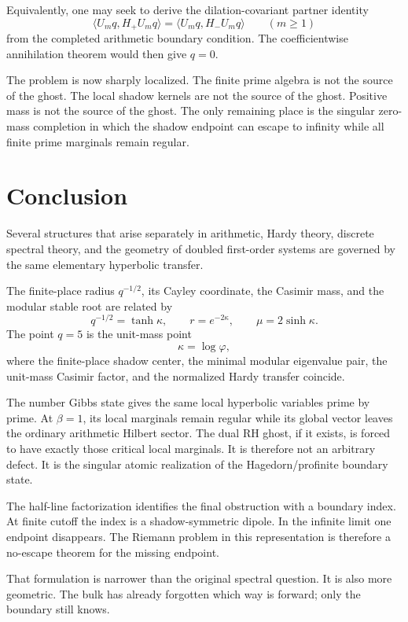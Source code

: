 \documentclass[11pt]{article}
\theoremstyle{definition}
\theoremstyle{remark}
\begin{document}
Equivalently, one may seek to derive the dilation-covariant partner identity
\[
\langle U_mq,H_+U_mq\rangle
=
\langle U_mq,H_-U_mq\rangle
\qquad(m\ge1)
\]
from the completed arithmetic boundary condition.  The coefficientwise annihilation theorem would then give \(q=0\).

The problem is now sharply localized.  The finite prime algebra is not the source of the ghost.  The local shadow kernels are not the source of the ghost.  Positive mass is not the source of the ghost.  The only remaining place is the singular zero-mass completion in which the shadow endpoint can escape to infinity while all finite prime marginals remain regular.

\section{Conclusion}

Several structures that arise separately in arithmetic, Hardy theory, discrete spectral theory, and the geometry of doubled first-order systems are governed by the same elementary hyperbolic transfer.

The finite-place radius \(q^{-1/2}\), its Cayley coordinate, the Casimir mass, and the modular stable root are related by
\[
q^{-1/2}=\tanh\kappa,\qquad
r=e^{-2\kappa},\qquad
\mu=2\sinh\kappa.
\]
The point \(q=5\) is the unit-mass point
\[
\kappa=\log\varphi,
\]
where the finite-place shadow center, the minimal modular eigenvalue pair, the unit-mass Casimir factor, and the normalized Hardy transfer coincide.

The number Gibbs state gives the same local hyperbolic variables prime by prime.  At \(\beta=1\), its local marginals remain regular while its global vector leaves the ordinary arithmetic Hilbert sector.  The dual RH ghost, if it exists, is forced to have exactly those critical local marginals.  It is therefore not an arbitrary defect.  It is the singular atomic realization of the Hagedorn/profinite boundary state.

The half-line factorization identifies the final obstruction with a boundary index.  At finite cutoff the index is a shadow-symmetric dipole.  In the infinite limit one endpoint disappears.  The Riemann problem in this representation is therefore a no-escape theorem for the missing endpoint.

That formulation is narrower than the original spectral question.  It is also more geometric.  The bulk has already forgotten which way is forward; only the boundary still knows.
\end{document}
